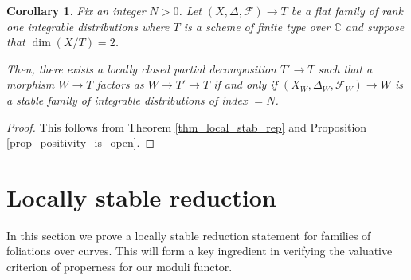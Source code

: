 \documentclass[12pt, a4paper]{amsart}
\newcounter{Theorem}
\newtheorem{corollary}[theorem]{Corollary}
\theoremstyle{definition}
\theoremstyle{named}
\begin{document}
\begin{corollary}
\label{cor_stab_rep}
Fix an integer $N>0$.  Let $(X, \Delta, \mathcal F) \rightarrow T$ be a flat family
    of rank one integrable distributions where $T$ is a scheme of finite type over $\mathbb C$ and suppose that $\dim (X/T) = 2$. 



    
    Then, there exists a locally closed partial decomposition $T' \rightarrow T$ such that 
    a morphism $W \rightarrow T$ factors as $W \rightarrow T' \rightarrow T$
    if and only if $(X_W, \Delta_W, \mathcal F_W) \rightarrow W$ is a stable family of integrable distributions of index $=N$.
\end{corollary}
\begin{proof}
   This follows from Theorem \ref{thm_local_stab_rep} 
   and Proposition \ref{prop_positivity_is_open}.
\end{proof}
    











\section{Locally stable reduction}

In this section we prove a locally stable reduction statement for families of foliations over curves.  This will form a key ingredient in verifying the valuative criterion of properness for our moduli functor.
\end{document}
